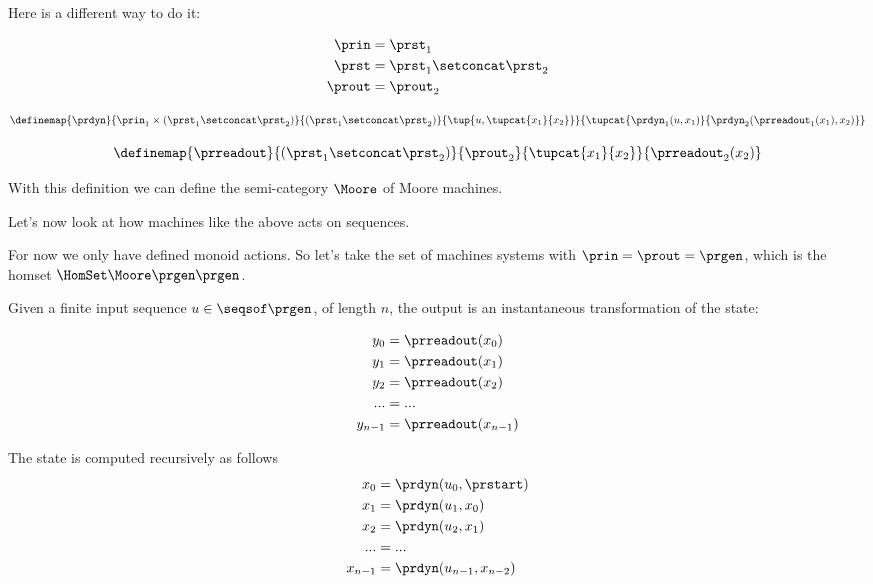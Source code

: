 Here is a different way to do it:

\begin{equation}
  \begin{aligned}
  \prin &= \prst_1   \\
  \prst &= \prst_1 \setconcat \prst_2 \\
  \prout &= \prout_2 \\
  \end{aligned}
\end{equation}

\begin{equation}
  \definemap{
    \prdyn
    }{
      \prin_1 \times (\prst_1 \setconcat \prst_2) 
    }{
      (\prst_1 \setconcat \prst_2)
    }{
      \tup{u, \tupcat{x_1}{x_2}}
    }{
      \tupcat{ \prdyn_1 (u, x_1)}{\prdyn_2(\prreadout_1(x_1), x_2)}
    }
\end{equation}

\begin{equation}
  \definemap{
    \prreadout
    }{
      (\prst_1 \setconcat \prst_2) 
    }{
      \prout_2
    }{
      \tupcat{x_1}{x_2}
    }{
      \prreadout_2(x_2)
    }
\end{equation}

With this definition we can define the semi-category $\Moore$ of Moore machines. 

Let's now look at how machines like the above acts on sequences. 

For now we only have defined monoid actions. So let's take the set of machines systems with $\prin = \prout = \prgen$, which is the homset $\HomSet\Moore\prgen\prgen$.

Given a finite input sequence $u \in \seqsof \prgen$, of length $n$, the output is an instantaneous transformation of the state:

\begin{equation}
  \begin{aligned}
  y_0 &= \prreadout(x_0) \\ 
  y_1 &= \prreadout(x_1) \\ 
  y_2 &= \prreadout(x_2) \\ 
  ... &= ...  \\
  y_{n-1} &= \prreadout(x_{n-1}) 
\end{aligned} 
\end{equation}

The state is computed recursively as follows 
\begin{equation}
  \begin{aligned}
  x_0 &= \prdyn(u_0, \prstart) \\ 
  x_1 &= \prdyn(u_1, x_0) \\ 
  x_2 &= \prdyn(u_2, x_1) \\ 
  ... &= ... \\
  x_{n-1} &= \prdyn(u_{n-1}, x_{n-2}) 
  \end{aligned}
\end{equation}

